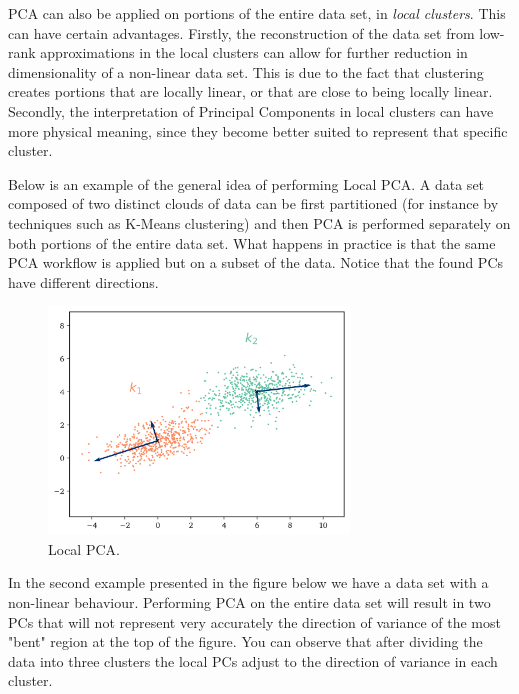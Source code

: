 \documentclass[10pt,twocolumn]{article}
\begin{document}
PCA can also be applied on portions of the entire data set, in \textit{local clusters}. This can have certain advantages. Firstly, the reconstruction of the data set from low-rank approximations in the local clusters can allow for further reduction in dimensionality of a non-linear data set. This is due to the fact that clustering creates portions that are locally linear, or that are close to being locally linear. Secondly, the interpretation of Principal Components in local clusters can have more physical meaning, since they become better suited to represent that specific cluster.

Below is an example of the general idea of performing Local PCA. A data set composed of two distinct clouds of data can be first partitioned (for instance by techniques such as K-Means clustering) and then PCA is performed separately on both portions of the entire data set. What happens in practice is that the same PCA workflow is applied but on a subset of the data. Notice that the found PCs have different directions.

\begin{figure}[H]
\centering\includegraphics[width=8cm]{lpca-on-cloud-data.png}
\caption{Local PCA.}
\label{fig:local-pca}
\end{figure}

In the second example presented in the figure below we have a data set with a non-linear behaviour. Performing PCA on the entire data set will result in two PCs that will not represent very accurately the direction of variance of the most "bent" region at the top of the figure. You can observe that after dividing the data into three clusters the local PCs adjust to the direction of variance in each cluster.
\end{document}
